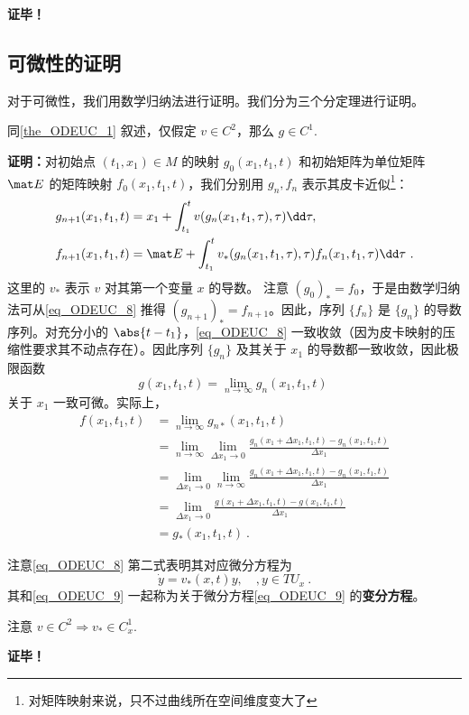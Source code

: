 \textbf{证毕！}

\subsection{可微性的证明}
对于可微性，我们用数学归纳法进行证明。我们分为三个分定理进行证明。
\begin{theorem}{}
同\autoref{the_ODEUC_1} 叙述，仅假定 $v\in C^2$，那么 $g\in C^1$.
\end{theorem}
\textbf{证明：}对初始点 $(t_1,x_1)\in M$ 的映射 $g_0(x_1,t_1,t)$ 和初始矩阵为单位矩阵 $\mat E$ 的矩阵映射 $f_0(x_1,t_1,t)$，我们分别用 $g_n,f_n$ 表示其皮卡近似\footnote{对矩阵映射来说，只不过曲线所在空间维度变大了}：
\begin{equation}\label{eq_ODEUC_8}
\begin{aligned}
g_{n+1}(x_1,t_1,t)&=x_1+\int_{t_1}^{t}v(g_n(x_1,t_1,\tau),\tau)\dd\tau,\\
f_{n+1}(x_1,t_1,t)&=\mat E+\int_{t_1}^{t}v_{*}(g_n(x_1,t_1,\tau),\tau)f_n(x_1,t_1,\tau)\dd\tau~.
\end{aligned}
\end{equation}
这里的 $v_{*}$ 表示 $v$ 对其第一个变量 $x$ 的导数。
注意 $(g_{0})_{*}=f_0$，于是由数学归纳法可从\autoref{eq_ODEUC_8} 推得 $(g_{n+1})_{*}=f_{n+1}$。因此，序列 $\{f_n\}$ 是 $\{g_n\}$ 的导数序列。对充分小的 $\abs{t-t_1}$，\autoref{eq_ODEUC_8} 一致收敛（因为皮卡映射的压缩性要求其不动点存在）。因此序列 $\{g_n\}$ 及其关于 $x_1$ 的导数都一致收敛，因此极限函数
\begin{equation}
g(x_1,t_1,t)=\lim_{n\rightarrow\infty}g_n(x_1,t_1,t)~
\end{equation}
关于 $x_1$ 一致可微。实际上，
\begin{equation}
\begin{aligned}
f(x_1,t_1,t)&=\lim_{n\rightarrow\infty}g_{n*}(x_1,t_1,t)\\
&=\lim\limits_{n\rightarrow\infty}\lim\limits_{\Delta x_1\rightarrow0}\frac{g_{n}(x_1+\Delta x_1,t_1,t)-g_{n}(x_1,t_1,t)}{\Delta x_1}\\
&=\lim\limits_{\Delta x_1\rightarrow0}\lim\limits_{n\rightarrow\infty}\frac{g_{n}(x_1+\Delta x_1,t_1,t)-g_{n}(x_1,t_1,t)}{\Delta x_1}\\
&=\lim\limits_{\Delta x_1\rightarrow0}\frac{g(x_1+\Delta x_1,t_1,t)-g(x_1,t_1,t)}{\Delta x_1}\\
&=g_*(x_1,t_1,t)~.
\end{aligned}
\end{equation}


注意\autoref{eq_ODEUC_8} 第二式表明其对应微分方程为
\begin{equation}
\dot y=v_*(x,t)y,\quad ,y\in TU_x~.
\end{equation}
其和\autoref{eq_ODEUC_9} 一起称为关于微分方程\autoref{eq_ODEUC_9} 的\textbf{变分方程}。

注意 $v\in C^2\Rightarrow v_*\in C_{x}^1$.

\textbf{证毕！}

